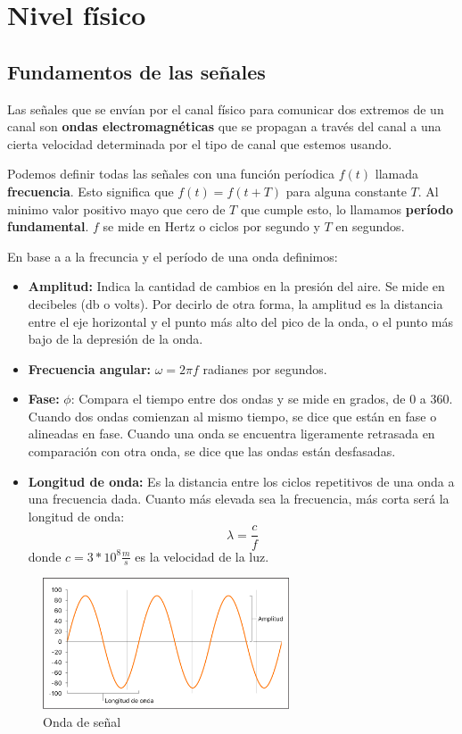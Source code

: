 \section{Nivel físico}
\subsection{Fundamentos de las señales}
Las señales que se envían por el canal físico para comunicar dos extremos de un canal son \textbf{ondas electromagnéticas} que se propagan a través del canal a una cierta velocidad determinada por el tipo de canal que estemos usando.


Podemos definir todas las señales con una función períodica \(f(t)\) llamada \textbf{frecuencia}. Esto significa que \(f(t) = f(t + T)\) para alguna constante \(T\). Al minimo valor positivo mayo que cero de \(T\) que cumple esto, lo llamamos \textbf{período fundamental}. \(f\) se mide en Hertz o ciclos por segundo y \(T\) en segundos. 

En base a a la frecuncia y el período de una onda definimos:

\begin{itemize}
  \item \textbf{Amplitud:} Indica la cantidad de cambios en la presión del aire. Se mide en decibeles (db o volts). Por decirlo de otra forma, la amplitud es la distancia entre el eje horizontal y el punto más alto del pico de la onda, o el punto más bajo de la depresión de la onda.
  \item \textbf{Frecuencia angular:} \(\omega = 2\pi f\) radianes por segundos.
  \item \textbf{Fase:} \(\phi\): Compara el tiempo entre dos ondas y se mide en grados, de 0 a 360. Cuando dos ondas comienzan al mismo tiempo, se dice que están en fase o alineadas en fase. Cuando una onda se encuentra ligeramente retrasada en comparación con otra onda, se dice que las ondas están desfasadas.
  \item \textbf{Longitud de onda:} Es la distancia entre los ciclos repetitivos de una onda a una frecuencia dada. Cuanto más elevada sea la frecuencia, más corta será la longitud de onda: \[\lambda = \frac{c}{f}\]
  donde \(c=3*10^8\frac{m}{s}\) es la velocidad de la luz.
\end{itemize}
\begin{figure}[H]
	\centering
	\includegraphics[width=0.65\textwidth
]{images/amplitud.png}
	\caption[Onda de señal]{Onda de señal}
	\label{fig:sistema-comunicacion-real}
\end{figure}

